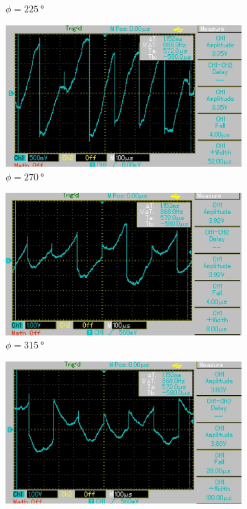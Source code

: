 \begin{figure}[H]
\begin{subfigure}{0.3\textwidth}
    \caption{$\phi = \SI{225}{\degree}$}
  \end{subfigure}
  \begin{subfigure}{0.3\textwidth}
    \centering
    \includegraphics[width=\textwidth]{build/n270.jpg}
    \caption{$\phi = \SI{270}{\degree}$}
  \end{subfigure}
  \begin{subfigure}{0.3\textwidth}
    \centering
    \includegraphics[width=\textwidth]{build/n315.jpg}
    \caption{$\phi = \SI{315}{\degree}$}
  \end{subfigure}
  \begin{subfigure}{0.3\textwidth}
    \centering
    \includegraphics[width=\textwidth]{build/n360.jpg}

\end{subfigure}
\end{figure}
